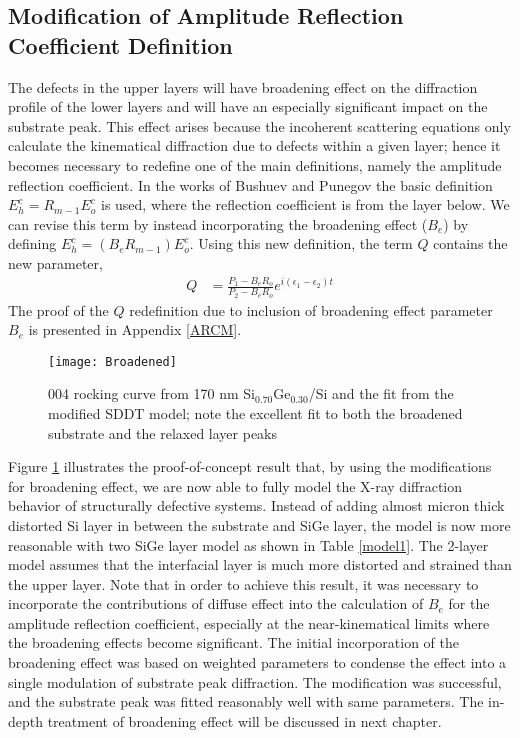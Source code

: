 		\subsection{Modification of Amplitude Reflection Coefficient Definition}

The defects in the upper layers will have broadening effect on the diffraction profile of the lower layers and will have an especially significant impact on the substrate peak.  This effect arises because the incoherent scattering equations only calculate the kinematical diffraction due to defects within a given layer; hence it becomes necessary to redefine one of the main definitions, namely the amplitude reflection coefficient.  In the works of Bushuev and Punegov the basic definition $E_h^c = R_{m-1} E_o^c$ is used, where the reflection coefficient is from the layer below.  We can revise this term by instead incorporating the broadening effect ($B_e$) by defining $E_h^c = (B_e R_{m-1}) E_o^c$.  Using this new definition, the term $Q$ contains the new parameter,
\begin{align}
Q &= \frac{P_1 - B_e R_o}{P_2- B_e R_o} e^{i (\epsilon_1 - \epsilon_2) t}
\end{align}
The proof of the $Q$ redefinition due to inclusion of broadening effect parameter $B_e$ is presented in Appendix \ref{ARCM}.  
%
\begin{figure}
	\texttt{[image: Broadened]}
	\caption{004 rocking curve from 170 nm Si$_{0.70}$Ge$_{0.30}$/Si and the fit from the modified SDDT model; note the excellent fit to both the broadened substrate and the relaxed layer peaks}
	\label{fig:GeSi2}
	\end{figure}
%
Figure \ref{fig:GeSi2} illustrates the proof-of-concept result that, by using the modifications for broadening effect, we are now able to fully model the X-ray diffraction behavior of structurally defective systems.  Instead of adding almost micron thick distorted Si layer in between the substrate and SiGe layer, the model is now more reasonable with two SiGe layer model as shown in Table \ref{model1}.  The 2-layer model assumes that the interfacial layer is much more distorted and strained than the upper layer.   Note that in order to achieve this result, it was necessary to incorporate the contributions of diffuse effect into the calculation of $B_e$ for the amplitude reflection coefficient, especially at the near-kinematical limits where the broadening effects become significant. The initial incorporation of the broadening effect was based on weighted parameters to condense the effect into a single modulation of substrate peak diffraction.  The modification was successful, and the substrate peak was fitted reasonably well with same parameters.  The in-depth treatment of broadening effect will be discussed in next chapter.


